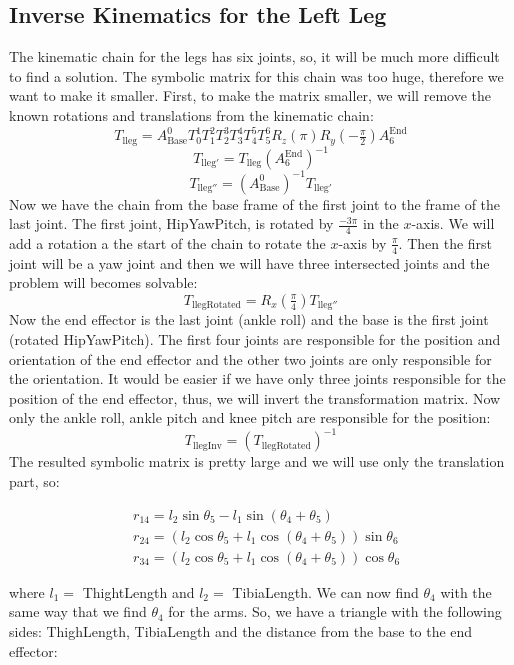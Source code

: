 \subsection{Inverse Kinematics for the Left Leg}
The kinematic chain for the legs has six joints, so, it will be much more difficult to find a solution. The symbolic matrix for this chain was too huge, therefore we want to make it smaller. First, to make the matrix smaller, we will remove the known rotations and translations from the kinematic chain:
\[
T_{\text{lleg}} = A^0_\text{Base}T^1_0T^2_1T^3_2T^4_3T^5_4T^6_5R_z(\pi)R_y(-\tfrac{\pi}{2})A^\text{End}_6
\]
\[
T_{\text{lleg}'} = T_\text{lleg}{\left(A^\text{End}_6\right)}^{-1}
\]
\[
T_{\text{lleg}''} = {\left(A^0_\text{Base}\right)}^{-1}T_{\text{lleg}'}
\]
Now we have the chain from the base frame of the first joint to the frame of the last joint. The first joint, HipYawPitch, is rotated by $ \frac{-3\pi}{4} $ in the $ x $-axis. We will add a rotation a the start of the chain to rotate the $x$-axis by $\frac{\pi}{4}$. Then the first joint will be a yaw joint and then we will have three intersected joints and the problem will becomes solvable:
\[
T_\text{llegRotated} = R_x(\tfrac{\pi}{4})T_{\text{lleg}''}
\]
Now the end effector is the last joint (ankle roll) and the base is the first joint (rotated HipYawPitch). The first four joints are responsible for the position and orientation of the end effector and the other two joints are only responsible for the orientation. It would be easier if we have only three joints responsible for the position of the end effector, thus, we will invert the transformation matrix. Now only the ankle roll, ankle pitch and knee pitch are responsible for the position:
\[
T_\text{llegInv} = {\left(T_\text{llegRotated}\right)}^{-1}
\]
The resulted symbolic matrix is pretty large and we will use only the translation part, so:
\begin{small}
\begin{align*}
&r_{14} = l_2\sin\theta_5 - l_1\sin\left(\theta_4 + \theta_5\right)\\
&r_{24} = \left(l_2\cos\theta_5 + l_1 \cos\left(\theta_4 + \theta_5\right)\right)\sin\theta_6\\
&r_{34} = \left(l_2\cos\theta_5 + l_1 \cos\left(\theta_4 + \theta_5\right)\right)\cos\theta_6
\end{align*}
\end{small}
where $l_1 =$ ThightLength and $l_2 =$ TibiaLength.
We can now find $\theta_4$ with the same way that we find $\theta_4$ for the arms. So, we have a triangle with the following sides: ThighLength, TibiaLength and the distance from the base to the end effector:

